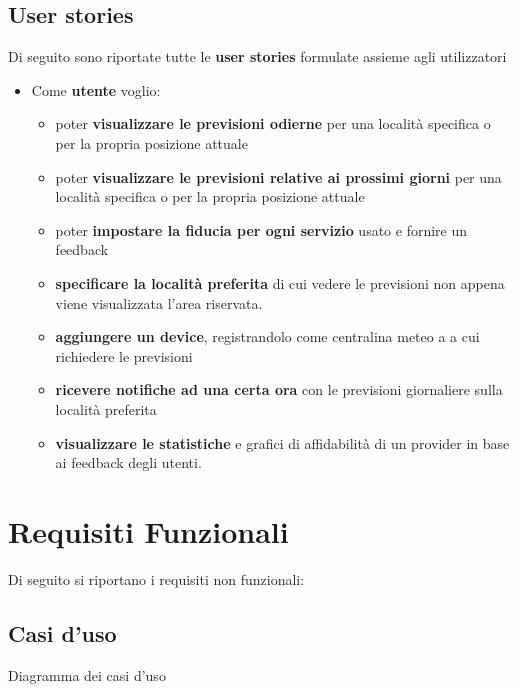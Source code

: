         \subsection{User stories}
        Di seguito sono riportate tutte le \textbf{user stories} formulate assieme agli utilizzatori
        \begin{itemize}
            \item Come \textbf{utente}
            voglio:
            \begin{itemize}
                \item poter \textbf{visualizzare le previsioni odierne} per una località specifica o per la propria posizione attuale
                \item poter \textbf{visualizzare le previsioni relative ai prossimi giorni} per una località specifica o per la propria posizione attuale
                \item poter \textbf{impostare la fiducia per ogni servizio} usato e fornire un feedback
                \item \textbf{specificare la località preferita} di cui vedere le previsioni non appena viene visualizzata l'area riservata.
                \item \textbf{aggiungere un device}, registrandolo come centralina meteo a a cui richiedere le previsioni
                \item \textbf{ricevere notifiche ad una certa ora} con le previsioni giornaliere sulla località preferita
                \item \textbf{visualizzare le statistiche} e grafici di affidabilità di un provider in base ai feedback degli utenti.
                
            \end{itemize}
        \end{itemize}
            
	    
	\section{Requisiti Funzionali} %
	Di seguito si riportano i requisiti non funzionali:
	    \subsection{Casi d'uso}
        	 Diagramma dei casi d'uso
                    
